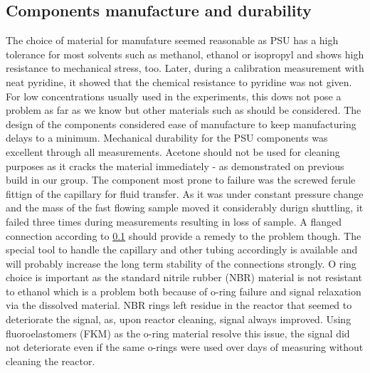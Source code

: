         \subsection{Components manufacture and durability}
            The choice of material for manufature seemed reasonable as PSU has a high tolerance for most solvents such as methanol, ethanol or isopropyl and shows high resistance to mechanical stress, too. Later, during a calibration measurement with neat pyridine, it showed that the chemical resistance to pyridine was not given. For low concentrations usually used in the experiments, this dows not pose a problem as far as we know but other materials such as  should be considered. The design of the components considered ease of manufacture to keep manufacturing delays to a minimum.
            Mechanical durability for the PSU components was excellent through all measurements. Acetone should not be used for cleaning purposes as it cracks the material immediately - as demonstrated on previous build in our group. The component most prone to failure was the screwed ferule fittign of the capillary for fluid transfer. As it was under constant pressure change and the mass of the fast flowing sample moved it considerably durign shuttling, it failed three times during measurements resulting in loss of sample. A flanged connection according to \ref{} should provide a remedy to the problem though. The special tool to handle the capillary and other tubing accordingly is available and will probably increase the long term stability of the connections strongly.
            O ring choice is important as the standard nitrile rubber (NBR) material is not resistant to ethanol which is a problem both because of o-ring failure and signal relaxation via the dissolved material. NBR rings left residue in the reactor that seemed to deteriorate the signal, as, upon reactor cleaning, signal always improved. Using fluoroelastomers (FKM) as the o-ring material resolve this issue, the signal did not deteriorate even if the same o-rings were used over days of measuring without cleaning the reactor.
